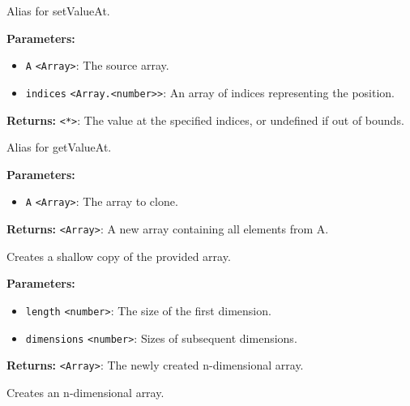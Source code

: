 \documentclass[12pt,a4paper]{article}
\begin{document}
\noindent Alias for setValueAt.

\vspace{5mm}
\noindent {}


\noindent \textbf{Parameters:}
\begin{itemize}
  \item \texttt{A} \texttt{<Array>}: The source array.
  \item \texttt{indices} \texttt{<Array.<number>>}: An array of indices representing the position.
\end{itemize}

\noindent \textbf{Returns:} \texttt{<*>}: The value at the specified indices, or undefined if out of bounds.

\noindent Alias for getValueAt.

\vspace{5mm}
\noindent {}


\noindent \textbf{Parameters:}
\begin{itemize}
  \item \texttt{A} \texttt{<Array>}: The array to clone.
\end{itemize}

\noindent \textbf{Returns:} \texttt{<Array>}: A new array containing all elements from A.

\noindent Creates a shallow copy of the provided array.

\vspace{5mm}
\noindent {}


\noindent \textbf{Parameters:}
\begin{itemize}
  \item \texttt{length} \texttt{<number>}: The size of the first dimension.
  \item \texttt{dimensions} \texttt{<number>}: Sizes of subsequent dimensions.
\end{itemize}

\noindent \textbf{Returns:} \texttt{<Array>}: The newly created n-dimensional array.

\noindent Creates an n-dimensional array.
\end{document}
